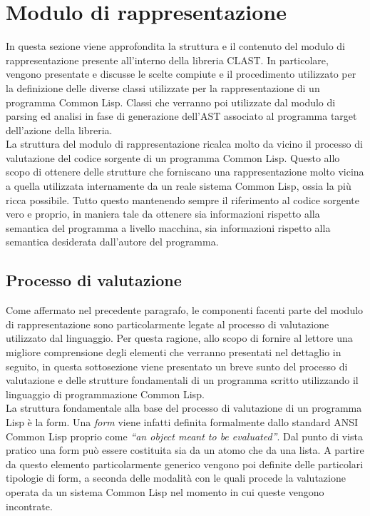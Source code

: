 \section{Modulo di rappresentazione}
\label{representation}

In questa sezione viene approfondita la struttura e il contenuto del modulo di
rappresentazione presente all'interno della libreria CLAST. In particolare,
vengono presentate e discusse le scelte compiute e il procedimento utilizzato
per la definizione delle diverse classi utilizzate per la rappresentazione di un
programma Common Lisp. Classi che verranno poi utilizzate dal modulo di parsing
ed analisi in fase di generazione dell'AST associato al programma target
dell'azione della libreria.\\

La struttura del modulo di rappresentazione ricalca molto da vicino il processo
di valutazione del codice sorgente di un programma Common Lisp. Questo allo
scopo di ottenere delle strutture che forniscano una rappresentazione molto
vicina a quella utilizzata internamente da un reale sistema Common Lisp, ossia
la più ricca possibile. Tutto questo mantenendo sempre il riferimento al codice
sorgente vero e proprio, in maniera tale da ottenere sia informazioni rispetto
alla semantica del programma a livello macchina, sia informazioni rispetto alla
semantica desiderata dall’autore del programma.

\subsection{Processo di valutazione}
\label{CL-valutazione}

Come affermato nel precedente paragrafo, le componenti facenti parte del
modulo di rappresentazione sono particolarmente legate al processo di
valutazione utilizzato dal linguaggio. Per questa ragione, allo scopo di
fornire al lettore una migliore comprensione degli elementi che verranno
presentati nel dettaglio in seguito, in questa sottosezione viene presentato
un breve sunto del processo di valutazione e delle strutture fondamentali di
un programma scritto utilizzando il linguaggio di programmazione Common
Lisp.\\

La struttura fondamentale alla base del processo di valutazione di un programma
Lisp è la form. Una \textit{form} viene infatti definita formalmente dallo
standard ANSI Common Lisp proprio come \textit{“an object meant to be
evaluated”}. Dal punto di vista pratico una form può essere costituita sia da un
atomo che da una lista. A partire da questo elemento particolarmente generico
vengono poi definite delle particolari tipologie di form, a seconda delle
modalità con le quali procede la valutazione operata da un sistema Common Lisp
nel momento in cui queste vengono incontrate.

